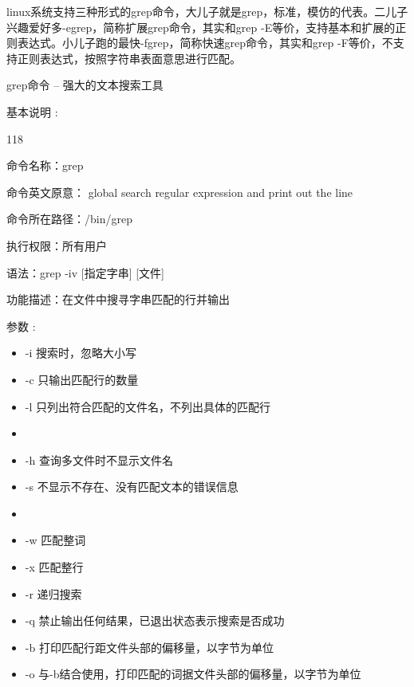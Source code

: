 linux系统支持三种形式的grep命令，大儿子就是grep，标准，模仿的代表。二儿子兴趣爱好多-egrep，简称扩展grep命令，其实和grep -E等价，支持基本和扩展的正则表达式。小儿子跑的最快-fgrep，简称快速grep命令，其实和grep -F等价，不支持正则表达式，按照字符串表面意思进行匹配。
\begin{ascolorbox5}{grep命令 – 强大的文本搜索工具}
	\begin{ascboxE}{基本说明 :}
		\begin{dinglist}{118}
			\item 命令名称：grep 
			\item 命令英文原意： global search regular expression and print out the line
			\item 命令所在路径：/bin/grep 
			\item 执行权限：所有用户 
			\item 语法：grep  -iv [指定字串] [文件] 
			\item 功能描述：在文件中搜寻字串匹配的行并输出      
		\end{dinglist}
	\end{ascboxE}
	\begin{ascboxB}{参数 :}
		\begin{itemize}
			\item -i	搜索时，忽略大小写
			\item -c	只输出匹配行的数量
			\item -l	只列出符合匹配的文件名，不列出具体的匹配行
			\item {}
			\item -h	查询多文件时不显示文件名
			\item -s	不显示不存在、没有匹配文本的错误信息
			\item {}
			\item -w	匹配整词
			\item -x	匹配整行
			\item -r	递归搜索
			\item -q	禁止输出任何结果，已退出状态表示搜索是否成功
			\item -b	打印匹配行距文件头部的偏移量，以字节为单位
			\item -o	与-b结合使用，打印匹配的词据文件头部的偏移量，以字节为单位
		\end{itemize}
	\end{ascboxB}
\end{ascolorbox5}
